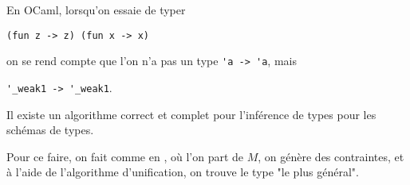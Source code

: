 \documentclass[./main]{subfiles}
\begin{document}
  En OCaml, lorsqu'on essaie de typer
  \begin{center}
    \lstinline|(fun z -> z) (fun x -> x)|
  \end{center}
  on se rend compte que l'on n'a pas un type \lstinline|'a -> 'a|, mais
  \begin{center}
    \lstinline|'_weak1 -> '_weak1|.
  \end{center}

  \begin{thm}
    Il existe un algorithme correct et complet pour l'inférence de types pour les schémas de types.
  \end{thm}
  
  Pour ce faire, on fait comme en , où l'on part de $M$, on génère des contraintes, et à l'aide de l'algorithme d'unification, on trouve le type "le plus général".
\end{document}
